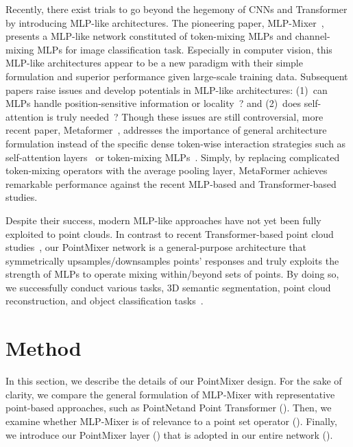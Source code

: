 Recently, there exist trials to go beyond the hegemony of CNNs and Transformer by introducing MLP-like architectures. The pioneering paper, MLP-Mixer~\cite{mlp-mixer}, presents a MLP-like network constituted of token-mixing MLPs and channel-mixing MLPs for image classification task. Especially in computer vision, this MLP-like architectures appear to be a new paradigm with their simple formulation and superior performance given large-scale training data. Subsequent papers raise issues and develop potentials in MLP-like architectures: 
(1)~can MLPs handle position-sensitive information or locality~\cite{as-mlp,vision-permutator,spatial-sift-mlp,cyclemlp,repmlpnet}? 
and (2)~does self-attention is truly needed~\cite{synthesizer,gmlp,morphmlp}? Though these issues are still controversial, more recent paper, Metaformer~\cite{metaformer}, addresses the importance of general architecture formulation instead of the specific dense token-wise interaction strategies such as self-attention layers~\cite{transformer,ViT} or token-mixing MLPs~\cite{mlp-mixer}. Simply, by replacing complicated token-mixing operators with the average pooling layer, MetaFormer achieves remarkable performance against the recent MLP-based and Transformer-based studies.




Despite their success, modern MLP-like approaches have not yet been fully exploited to point clouds. In contrast to recent Transformer-based point cloud studies~\cite{point-transformer,cloud-transformer,point-cloud-transformer,park2022fast}, our PointMixer network is a general-purpose architecture that symmetrically upsamples/downsamples points' responses and truly exploits the strength of MLPs to operate mixing within/beyond sets of points. By doing so, we successfully conduct various tasks, 3D semantic segmentation, point cloud reconstruction, and object classification tasks~\cite{armeni_cvpr16,point-recon,modelnet40}.
 


\section{Method}
\label{sec:PointMixer}
In this section, we describe the details of our PointMixer design. For the sake of clarity, we compare the general formulation of MLP-Mixer with representative point-based approaches, such as PointNet\plusplus and Point Transformer (). Then, we examine whether MLP-Mixer is of relevance to a point set operator (). Finally, we introduce our PointMixer layer () that is adopted in our entire network ().



